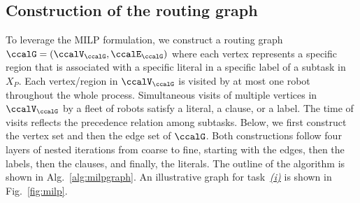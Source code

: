 \documentclass[Afour,sageh,times]{sagej}
\begin{document}
\subsection{Construction of the routing graph}\label{sec:graph}
To leverage the MILP formulation, we construct a routing graph $\ccalG = (\ccalV_{\ccalG},\ccalE_{\ccalG})$ where each vertex represents a specific region that is associated with a specific literal in a specific label of a subtask in $X_P$. Each vertex/region in $\ccalV_\ccalG$ is visited by at most one robot throughout the whole process. Simultaneous visits of multiple vertices in $\ccalV_\ccalG$ by a fleet of robots  satisfy a literal, a clause, or a label. The time of visits reflects the precedence relation among subtasks. Below, we first construct  the vertex set and then the edge set of $\ccalG$. Both constructions follow four layers of nested iterations from coarse to fine, starting with the edges, then the labels, then the clauses, and finally, the literals. The outline of the algorithm is shown in Alg.~\ref{alg:milpgraph}.  %
An illustrative graph for task~\hyperref[task:i]{\it (i)}  is  shown in Fig.~\ref{fig:milp}.
\end{document}
